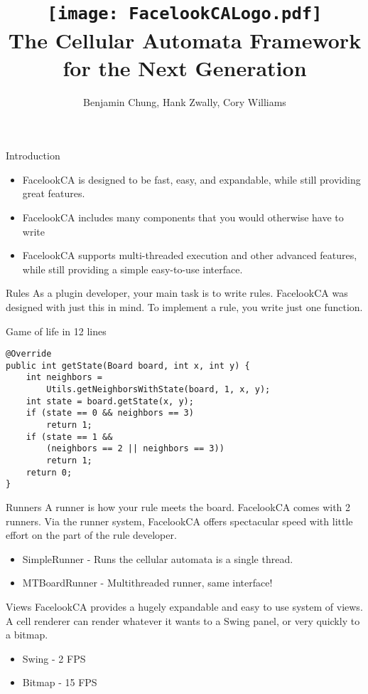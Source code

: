 \documentclass{beamer}
\title{\texttt{[image: FacelookCALogo.pdf]}\\
The Cellular Automata Framework for
the Next Generation}
\author{Benjamin Chung, Hank Zwally, Cory Williams}
\begin{document}
\maketitle
\begin{frame}{Introduction}
\begin{itemize}
  \item FacelookCA is designed to be fast, easy, and expandable, while still providing
great features.
\item FacelookCA includes many components that you would otherwise have to
write
\item FacelookCA supports multi-threaded execution and other advanced features,
while still providing a simple easy-to-use interface.
\end{itemize}
\end{frame}
\begin{frame}[fragile]{Rules}
As a plugin developer, your main task is to write rules. FacelookCA was designed
with just this in mind. To implement a rule, you write just one function.
\begin{exampleblock}{Game of life in 12 lines}
\begin{lstlisting}
@Override
public int getState(Board board, int x, int y) {
    int neighbors = 
        Utils.getNeighborsWithState(board, 1, x, y);
    int state = board.getState(x, y);
    if (state == 0 && neighbors == 3) 
        return 1;
    if (state == 1 && 
        (neighbors == 2 || neighbors == 3))
        return 1;
    return 0;
}
\end{lstlisting}
\end{exampleblock}
\end{frame}
\begin{frame}{Runners}
A runner is how your rule meets the board. FacelookCA comes with 2 runners. Via
the runner system, FacelookCA offers spectacular speed with little effort on the part of the rule developer.
\begin{itemize}
  \item SimpleRunner - Runs the cellular automata is a single thread.
  \item MTBoardRunner - Multithreaded runner, same interface!
\end{itemize}
\end{frame}
\begin{frame}{Views}
FacelookCA provides a hugely expandable and easy to use system of views. A cell
renderer can render whatever it wants to a Swing panel, or very quickly to a
bitmap.

\begin{itemize}
  \item Swing - 2 FPS
  \item Bitmap - 15 FPS
\end{itemize}
\end{frame}
\end{document}

